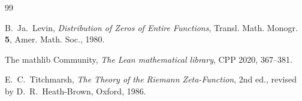 \documentclass[11pt,a4paper]{amsart}
\theoremstyle{plain}
\theoremstyle{definition}
\begin{document}
\begin{thebibliography}{99}

B.~Ja.~Levin,
\emph{Distribution of Zeros of Entire Functions},
Transl. Math. Monogr. \textbf{5}, Amer. Math. Soc., 1980.

The mathlib Community,
\emph{The Lean mathematical library},
CPP 2020, 367--381.

E.~C.~Titchmarsh,
\emph{The Theory of the Riemann Zeta-Function},
2nd ed., revised by D.~R.~Heath-Brown, Oxford, 1986.

\end{thebibliography}
\end{document}
